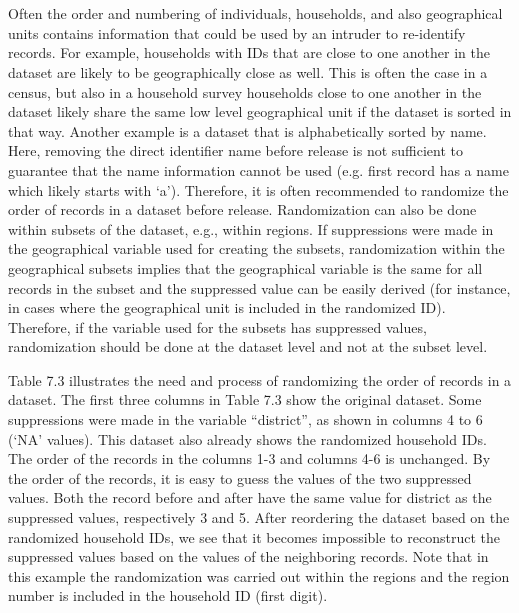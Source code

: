 \documentclass[letterpaper,10pt,english]{sphinxmanual}
\begin{document}
\section{}
\label{\detokenize{sdcMicro:randomizing-order-and-numbering-of-individuals-or-households}}
Often the order and numbering of individuals, households, and also
geographical units contains information that could be used by an
intruder to re-identify records. For example, households with IDs that
are close to one another in the dataset are likely to be geographically
close as well. This is often the case in a census, but also in a
household survey households close to one another in the dataset likely
share the same low level geographical unit if the dataset is sorted in
that way. Another example is a dataset that is alphabetically sorted by
name. Here, removing the direct identifier name before release is not
sufficient to guarantee that the name information cannot be used (e.g.
first record has a name which likely starts with ‘a’). Therefore, it is
often recommended to randomize the order of records in a dataset before
release. Randomization can also be done within subsets of the dataset,
e.g., within regions. If suppressions were made in the geographical
variable used for creating the subsets, randomization within the
geographical subsets implies that the geographical variable is the same
for all records in the subset and the suppressed value can be easily
derived (for instance, in cases where the geographical unit is included
in the randomized ID). Therefore, if the variable used for the subsets
has suppressed values, randomization should be done at the dataset level
and not at the subset level.

Table 7.3 illustrates the need and process of randomizing the order of
records in a dataset. The first three columns in Table 7.3 show the
original dataset. Some suppressions were made in the variable
“district”, as shown in columns 4 to 6 (‘NA’ values). This dataset also
already shows the randomized household IDs. The order of the records in
the columns 1-3 and columns 4-6 is unchanged. By the order of the
records, it is easy to guess the values of the two suppressed values.
Both the record before and after have the same value for district as the
suppressed values, respectively 3 and 5. After reordering the dataset
based on the randomized household IDs, we see that it becomes impossible
to reconstruct the suppressed values based on the values of the
neighboring records. Note that in this example the randomization was
carried out within the regions and the region number is included in the
household ID (first digit).
\end{document}
